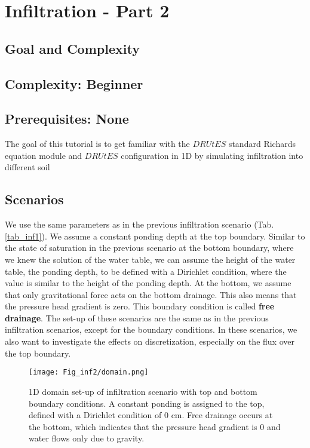 \section{Infiltration - Part 2}
\subsection{Goal and Complexity}
\subsection*{Complexity: Beginner}

\subsection*{Prerequisites: None}

The goal of this tutorial is to get familiar with the $DRUtES$ standard Richards equation module and $DRUtES$ configuration in 1D by simulating infiltration into different soil \medskip

\subsection{Scenarios}

We use the same parameters as in the previous infiltration scenario (Tab. \ref{tab_inf1}). We assume a constant ponding depth at the top boundary.  Similar to the state of saturation in the previous scenario at the bottom boundary, where we knew the solution of the water table, we can assume the height of the water table, the ponding depth, to be defined with a Dirichlet condition, where the value is similar to the height of the ponding depth. At the bottom, we assume that only gravitational force acts on the bottom drainage. This also means that the pressure head gradient is zero. This boundary condition is called \textbf{free drainage}. The set-up of these scenarios are the same as in the previous infiltration scenarios, except for the boundary conditions. In these scenarios, we also want to investigate the effects on discretization, especially on the flux over the top boundary.  


\begin{figure}[!h]
\centering
\texttt{[image: Fig\_inf2/domain.png]}
\caption{1D domain set-up of infiltration scenario with top and bottom boundary conditions. A constant ponding is assigned to the top, defined with a Dirichlet condition of 0 cm. Free drainage occurs at the bottom, which indicates that the pressure head gradient is 0 and water flows only due to gravity.}
\end{figure}

